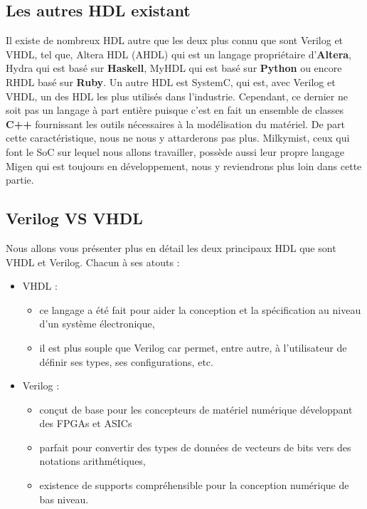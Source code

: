 \subsection{Les autres HDL existant}
\vspace{15px}
Il existe de nombreux HDL autre que les deux plus connu que sont Verilog et VHDL, tel que, Altera HDL (AHDL) qui est un langage propriétaire d'\textbf{Altera}, Hydra qui est basé sur \textbf{Haskell}, MyHDL qui est basé sur \textbf{Python} ou encore RHDL basé sur \textbf{Ruby}. Un autre HDL est SystemC, qui est, avec Verilog et VHDL, un des HDL les plus utilisés dans l'industrie. Cependant, ce dernier ne soit pas un langage à part entière puisque c'est en fait un ensemble de classes \textbf{C++} fournissant les outils nécessaires à la modélisation du matériel. De part cette caractéristique, nous ne nous y attarderons pas plus. Milkymist, ceux qui font le SoC sur lequel nous allons travailler, possède aussi leur propre langage Migen qui est toujours en développement, nous y reviendrons plus loin dans cette partie.

\subsection{Verilog VS VHDL}
\vspace{15px}
Nous allons vous présenter plus en détail les deux principaux HDL que sont VHDL et Verilog. Chacun à ses atouts :
\begin{itemize}
\item VHDL :
\begin{itemize}
\item ce langage a été fait pour aider la conception et la spécification au niveau d'un système électronique,
\item il est plus souple que Verilog car permet, entre autre, à l'utilisateur de définir ses types, ses configurations, etc.
\end{itemize}
\item Verilog :
\begin{itemize}
\item conçut de base pour les concepteurs de matériel numérique développant des FPGAs et ASICs
\item parfait pour convertir des types de données de vecteurs de bits vers des notations arithmétiques,
\item existence de supports compréhensible pour la conception numérique de bas niveau.
\end{itemize}
\end{itemize}

